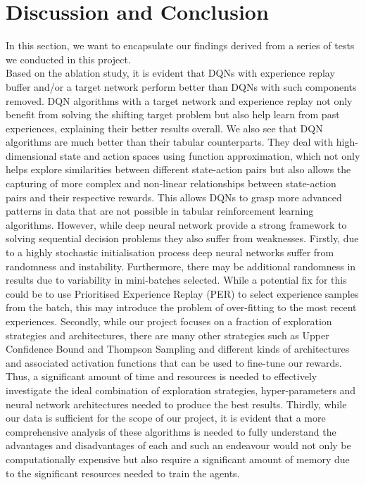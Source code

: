 \documentclass{article}
\begin{document}
\section*{Discussion and Conclusion}
In this section, we want to encapsulate our findings derived from a series of tests we conducted in this project.\\
Based on the ablation study, it is evident that DQNs with experience replay buffer and/or a target network perform better than DQNs with such components removed. DQN algorithms with a target network and experience replay not only benefit from solving the shifting target problem but also help learn from past experiences, explaining their better results overall. We also see that DQN algorithms are much better than their tabular counterparts. They deal with high-dimensional state and action spaces using function approximation, which not only helps explore similarities between different state-action pairs but also allows the capturing of more complex and non-linear relationships between state-action pairs and their respective rewards. This allows DQNs to grasp more advanced patterns in data that are not possible in tabular reinforcement learning algorithms.  
\newline However, while deep neural network provide a strong framework to solving sequential decision problems they also suffer from weaknesses. Firstly, due to a highly stochastic initialisation process deep neural networks suffer from randomness and instability. Furthermore, there may be additional randomness in results due to variability in mini-batches selected. While a potential fix for this could be to use Prioritised Experience Replay (PER) to select experience samples from the batch, this may introduce the problem of over-fitting to the most recent experiences. 
\newline Secondly, while our project focuses on a fraction of exploration strategies and architectures, there are many other strategies such as Upper Confidence Bound \citep{ucb} and Thompson Sampling \citep{thompson} and different kinds of architectures and associated activation functions that can be used to fine-tune our rewards. Thus, a significant amount of time and resources is needed to effectively investigate the ideal combination of exploration strategies, hyper-parameters and neural network architectures needed to produce the best results. 
\newline Thirdly, while our data is sufficient for the scope of our project, it is evident that a more comprehensive analysis of these algorithms is needed to fully understand the advantages and disadvantages of each and such an endeavour would not only be computationally expensive but also require a significant amount of memory due to the significant resources needed to train the agents.\\
\end{document}
